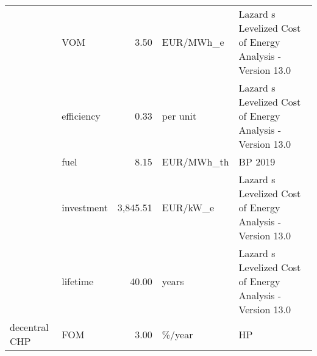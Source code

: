 \begin{longtable}{p{5cm}p{3cm}rp{3cm}p{11cm}}
                      & VOM &           3.50 &                         EUR/MWh\_e &                                                                                                                                                                                                                                                                            Lazard s Levelized Cost of Energy Analysis - Version 13.0 \\
                      & efficiency &           0.33 &                          per unit &                                                                                                                                                                                                                                                                            Lazard s Levelized Cost of Energy Analysis - Version 13.0 \\
                      & fuel &           8.15 &                        EUR/MWh\_th &                                                                                                                                                                                                                                                                                                                              BP 2019 \\
                      & investment &       3,845.51 &                          EUR/kW\_e &                                                                                                                                                                                                                                                                            Lazard s Levelized Cost of Energy Analysis - Version 13.0 \\
                      & lifetime &          40.00 &                             years &                                                                                                                                                                                                                                                                            Lazard s Levelized Cost of Energy Analysis - Version 13.0 \\
decentral CHP & FOM &           3.00 &                            \%/year &                                                                                                                                                                                                                                                                                                                                   HP \\

\end{longtable}

